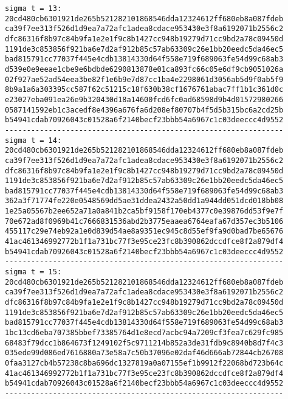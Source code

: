 \documentclass{article}
\begin{document}
{\begin{verbatim}
sigma t = 13:
20cd480cb6301921de265b521282101868546dda12324612ff680eb8a087fdeb
ca39f7ee313f526d1d9ea7a72afc1adea8cdace953430e3f8a6192071b2556c2
dfc86316f8b97c84b9fa1e2e1f9c8b1427cc948b19279d71cc9bd2a78c09450d
1191de3c853856f921ba6e7d2af912b85c57ab63309c26e1bb20eedc5da46ec5
bad815791cc77037f445e4cdb13814330d64f558e719f689063fe54d99c68ab3
d539e0e9eeae1cbe9e6bdbde6290813878e01ca893fc66c05e6df9cb9051026a
02f927ae52ad54eea3be82f1e6b9e7d87cc1ba4e2298061d3056ab5d9f0ab5f9
8b9a1a6a303395cc587f62c51215c18f630b38cf1676761abac7ff1b1c361d0c
e23027eba091ea26e9b320430d18a14600fcd6fc0ad68598d9b4d01572980266
0587141592eb1c3acedf8e4396a676fa6d208ef80707b4f5d5b315bc6a2cd25b
b54941cdab70926043c01528a6f2140becf23bbb54a6967c1c03deeccc4d9552
----------------------------------------------------------------
sigma t = 14:
20cd480cb6301921de265b521282101868546dda12324612ff680eb8a087fdeb
ca39f7ee313f526d1d9ea7a72afc1adea8cdace953430e3f8a6192071b2556c2
dfc86316f8b97c84b9fa1e2e1f9c8b1427cc948b19279d71cc9bd2a78c09450d
1191de3c853856f921ba6e7d2af912b85c57ab63309c26e1bb20eedc5da46ec5
bad815791cc77037f445e4cdb13814330d64f558e719f689063fe54d99c68ab3
362a3f71774fe220e0548569dd5ae31ddea2432a50dd1a944dd051dcd018bb08
1e25a05567b2ee652a71a0a841b2ca5bf9158f170eb4377c0e39876dd53f9e7f
70e672ad8f0969b41c7666831536abd2b3775eaaea6764eafa67d357ec3b5106
455117c29e74eb92a1e0d839d54ae8a9351ec945c8d55ef9fa9d0bad7be65676
41ac461346992772b1f1a731bc77f3e95ce23fc8b390862dccdfce8f2a879df4
b54941cdab70926043c01528a6f2140becf23bbb54a6967c1c03deeccc4d9552
----------------------------------------------------------------
sigma t = 15:
20cd480cb6301921de265b521282101868546dda12324612ff680eb8a087fdeb
ca39f7ee313f526d1d9ea7a72afc1adea8cdace953430e3f8a6192071b2556c2
dfc86316f8b97c84b9fa1e2e1f9c8b1427cc948b19279d71cc9bd2a78c09450d
1191de3c853856f921ba6e7d2af912b85c57ab63309c26e1bb20eedc5da46ec5
bad815791cc77037f445e4cdb13814330d64f558e719f689063fe54d99c68ab3
1bc13cd6eba707385bbef73385764d1e8ecd7acbc94a7209cf3fea7c629fc985
68483f79dcc1b864673f1249102f5c9711214b852a3de31fdb9c8940b8d7f4c3
035ede99d086ed7616880a73e58a7c50b37096e02daf46d666ab72844cb26708
0faa3127cb4b57238c8ba696dc1327819a0a07155ef1b9912f22068bd723b64c
41ac461346992772b1f1a731bc77f3e95ce23fc8b390862dccdfce8f2a879df4
b54941cdab70926043c01528a6f2140becf23bbb54a6967c1c03deeccc4d9552
----------------------------------------------------------------
 \end{verbatim}
 }
 
 
 \printbibliography
 
 
\end{document}
